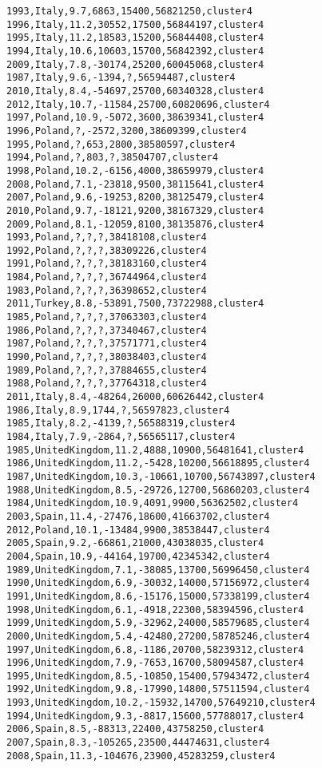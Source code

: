 \begin{lstlisting}[basicstyle=\footnotesize\ttfamily,numbers=none]
1993,Italy,9.7,6863,15400,56821250,cluster4
1996,Italy,11.2,30552,17500,56844197,cluster4
1995,Italy,11.2,18583,15200,56844408,cluster4
1994,Italy,10.6,10603,15700,56842392,cluster4
2009,Italy,7.8,-30174,25200,60045068,cluster4
1987,Italy,9.6,-1394,?,56594487,cluster4
2010,Italy,8.4,-54697,25700,60340328,cluster4
2012,Italy,10.7,-11584,25700,60820696,cluster4
1997,Poland,10.9,-5072,3600,38639341,cluster4
1996,Poland,?,-2572,3200,38609399,cluster4
1995,Poland,?,653,2800,38580597,cluster4
1994,Poland,?,803,?,38504707,cluster4
1998,Poland,10.2,-6156,4000,38659979,cluster4
2008,Poland,7.1,-23818,9500,38115641,cluster4
2007,Poland,9.6,-19253,8200,38125479,cluster4
2010,Poland,9.7,-18121,9200,38167329,cluster4
2009,Poland,8.1,-12059,8100,38135876,cluster4
1993,Poland,?,?,?,38418108,cluster4
1992,Poland,?,?,?,38309226,cluster4
1991,Poland,?,?,?,38183160,cluster4
1984,Poland,?,?,?,36744964,cluster4
1983,Poland,?,?,?,36398652,cluster4
2011,Turkey,8.8,-53891,7500,73722988,cluster4
1985,Poland,?,?,?,37063303,cluster4
1986,Poland,?,?,?,37340467,cluster4
1987,Poland,?,?,?,37571771,cluster4
1990,Poland,?,?,?,38038403,cluster4
1989,Poland,?,?,?,37884655,cluster4
1988,Poland,?,?,?,37764318,cluster4
2011,Italy,8.4,-48264,26000,60626442,cluster4
1986,Italy,8.9,1744,?,56597823,cluster4
1985,Italy,8.2,-4139,?,56588319,cluster4
1984,Italy,7.9,-2864,?,56565117,cluster4
1985,UnitedKingdom,11.2,4888,10900,56481641,cluster4
1986,UnitedKingdom,11.2,-5428,10200,56618895,cluster4
1987,UnitedKingdom,10.3,-10661,10700,56743897,cluster4
1988,UnitedKingdom,8.5,-29726,12700,56860203,cluster4
1984,UnitedKingdom,10.9,4091,9900,56362502,cluster4
2003,Spain,11.4,-27476,18600,41663702,cluster4
2012,Poland,10.1,-13484,9900,38538447,cluster4
2005,Spain,9.2,-66861,21000,43038035,cluster4
2004,Spain,10.9,-44164,19700,42345342,cluster4
1989,UnitedKingdom,7.1,-38085,13700,56996450,cluster4
1990,UnitedKingdom,6.9,-30032,14000,57156972,cluster4
1991,UnitedKingdom,8.6,-15176,15000,57338199,cluster4
1998,UnitedKingdom,6.1,-4918,22300,58394596,cluster4
1999,UnitedKingdom,5.9,-32962,24000,58579685,cluster4
2000,UnitedKingdom,5.4,-42480,27200,58785246,cluster4
1997,UnitedKingdom,6.8,-1186,20700,58239312,cluster4
1996,UnitedKingdom,7.9,-7653,16700,58094587,cluster4
1995,UnitedKingdom,8.5,-10850,15400,57943472,cluster4
1992,UnitedKingdom,9.8,-17990,14800,57511594,cluster4
1993,UnitedKingdom,10.2,-15932,14700,57649210,cluster4
1994,UnitedKingdom,9.3,-8817,15600,57788017,cluster4
2006,Spain,8.5,-88313,22400,43758250,cluster4
2007,Spain,8.3,-105265,23500,44474631,cluster4
2008,Spain,11.3,-104676,23900,45283259,cluster4

\end{lstlisting}
